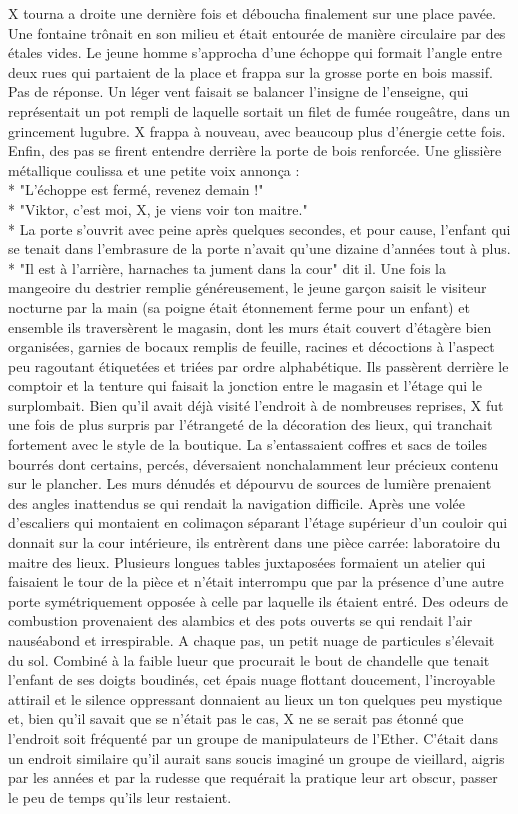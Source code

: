 \documentclass{book}
\begin{document}
X tourna a droite une dernière fois et déboucha finalement sur une place pavée. Une fontaine trônait en son milieu et était entourée de manière circulaire par des étales vides. 
Le jeune homme s'approcha d'une échoppe qui formait l'angle entre deux rues qui partaient de la place et frappa sur la grosse porte en bois massif. Pas de réponse.
Un léger vent faisait se balancer l'insigne de l'enseigne, qui représentait un pot rempli de laquelle sortait un filet de fumée rougeâtre, dans un grincement lugubre. X frappa à nouveau, avec beaucoup plus d’énergie cette fois.
Enfin, des pas se firent entendre derrière la porte de bois renforcée. Une glissière métallique coulissa et une petite voix annonça : \\*
"L'échoppe est fermé, revenez demain !" \\*
"Viktor, c'est moi, X, je viens voir ton maitre." \\*
La porte s'ouvrit avec peine après quelques secondes, et pour cause, l'enfant qui se tenait dans l’embrasure de la porte n'avait qu'une dizaine d'années tout à plus. \\*
"Il est à l'arrière, harnaches ta jument dans la cour" dit il. Une fois la mangeoire du destrier remplie généreusement, le jeune garçon saisit le visiteur nocturne par la main (sa poigne était étonnement ferme  pour un enfant) et ensemble ils traversèrent le magasin, dont les murs était couvert d'étagère bien organisées, garnies de bocaux remplis de feuille, racines et décoctions à l'aspect peu ragoutant étiquetées et triées par ordre alphabétique. Ils passèrent derrière le comptoir et la tenture qui faisait la jonction entre le magasin et l'étage qui le surplombait.
Bien qu'il avait déjà visité l'endroit à de nombreuses reprises, X 	fut une fois de plus surpris 
par l'étrangeté de la décoration des lieux, qui tranchait fortement avec le style de la boutique. La s'entassaient coffres et sacs de toiles bourrés dont certains, percés, déversaient nonchalamment leur précieux contenu sur le plancher. Les murs  dénudés et dépourvu de sources de lumière prenaient des angles inattendus se qui rendait la navigation difficile. Après une volée d'escaliers qui montaient en colimaçon séparant l'étage supérieur d'un couloir qui donnait sur la cour intérieure, ils entrèrent dans une pièce carrée: laboratoire du maitre des lieux. Plusieurs longues tables juxtaposées formaient un atelier qui faisaient le tour de la pièce et n'était interrompu que par la présence d'une autre porte symétriquement opposée à celle par laquelle ils étaient entré. Des odeurs de combustion provenaient des alambics et des pots ouverts se qui rendait l'air nauséabond et irrespirable. A chaque pas, un petit nuage de particules s'élevait du sol. Combiné à la faible lueur que procurait le bout de chandelle que tenait l'enfant de ses doigts boudinés, cet épais nuage flottant doucement, l'incroyable attirail et le silence oppressant donnaient au lieux un ton quelques peu mystique et, bien qu'il savait que se n'était pas le cas, X ne se serait pas étonné que l'endroit soit fréquenté par un groupe de manipulateurs de l'Ether. C'était dans un endroit similaire qu'il aurait sans soucis imaginé un groupe de vieillard, aigris par les années et par la rudesse que requérait la pratique leur art obscur, passer le peu de temps qu'ils leur restaient.
\end{document}
